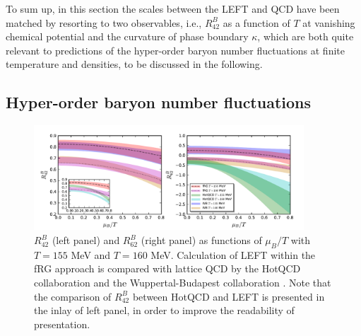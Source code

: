 \documentclass[%
reprint,
superscriptaddress,
showpacs,preprintnumbers,
 amsmath,amssymb,
 aps,
prd,
]{revtex4-1}
\begin{document}
To sum up, in this section the scales between the LEFT and QCD have been matched by resorting to two observables, i.e., $R^{B}_{42}$ as a function of $T$ at vanishing chemical potential and the curvature of phase boundary $\kappa$, which are both quite relevant to predictions of the hyper-order baryon number fluctuations at finite temperature and densities, to be discussed in the following. 


\subsection{Hyper-order baryon number fluctuations}
\label{subsec:hyper-order}

%
%

%
\begin{figure}[t]
\includegraphics[width=0.9\textwidth]{R42R62-muBoT}
\caption{$R^{B}_{42}$ (left panel) and $R^{B}_{62}$ (right panel) as functions of $\mu_B/T$ with $T=155$ MeV and $T=160$ MeV. Calculation of LEFT within the fRG approach is compared with lattice QCD by the HotQCD collaboration \cite{Bazavov:2020bjn} and the Wuppertal-Budapest collaboration \cite{Borsanyi:2018grb}. Note that the comparison of $R^{B}_{42}$ between HotQCD and LEFT is presented in the inlay of left panel, in order to improve the readability of presentation. 
}\label{fig:R42R62-muBoT}
\end{figure}
%
\end{document}
